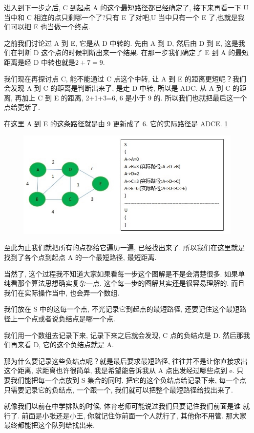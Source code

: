 进入到下一步之后, C 到起点 A 的这个最短路径都已经确定了, 接下来再看一下 U 当中和 C 相连的点只剩哪一个了?只有 E 了对吧,U 当中只有一个 E 了,也就是我们可以把 E 也当做一个终点. 

之前我们讨论过 A 到 E, 它是从 D 中转的. 先由 A 到 D, 然后由 D 到 E, 这是我们在判断 D 这个点的时候判断出来一个结果. 在那一步我们确定了 E 到 A 的最短距离是经 D 中转也就是$2+7=9$. 

我们现在再探讨点 C, 能不能通过 C 点这个中转, 让 A 到 E 的距离更短呢？我们会发现 A 到 C 的距离是判断出来了, 是走 D 中转, 所以是 ADC. 从 A 到 C 的距离, 再加上 C 到 E 的距离, 2+1+3=6, 6 是小于 9 的. 所以我们也就把最后这一个点给更新了. 

在这里 A 到 E 的这条路径就是由 9 更新成了 6. 它的实际路径是 ADCE. \ref{fig:img26_7} 

\begin{figure}[ht]
  \centering
  \caption{}
  \label{fig:img26_7}
  \includegraphics[width=0.7\linewidth]{asset/20230924051226.jpg}
\end{figure}

至此为止我们就把所有的点都给它遍历一遍, 已经找出来了. 所以我们在这里就是找到了各个点到起点 A 的一个最短路径, 最短距离. 

当然了, 这个过程我不知道大家如果看每一步这个图解是不是会清楚很多. 如果单纯看那个算法思想确实复杂一点. 这个每一步的图解其实还是很容易理解的. 而且我们在实际操作当中, 也会弄一个数组. 

我们放在 S 中的这每一个点, 不光记录它到起点的最短路径, 还要记住这个最短路径上一个点或者说负结点是哪一个点. 

我们用一个数组去记录下来, 记录下来之后就会发现, C 点的负结点是 D. 然后那我们再来看 D, 它的这个负结点就是 A. 

那为什么要记录这些负结点呢？就是最后要求最短路径, 往往并不是让你直接求出这个距离, 求距离也许很简单, 我是希望能告诉我从 A 点出发经过哪些点到 e. 只要我们能把每一个点放到 S 集合的同时, 把它的这个负结点给记录下来, 每一个点只需要记录它的负结点, 一个跟一个, 我们就可以把整个最短路径给找出来了. 

就像我们以前在中学排队的时候, 体育老师可能说过我们只要记住我们前面是谁
就行了. 前面是小张还是小王, 你就记住你前面一个人就行了, 其他你不用管. 那大家最终都能把这个队列给找出来. 


